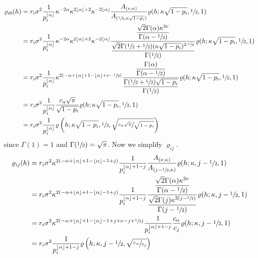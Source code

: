 \documentclass[11pt,a4paper]{article}
\theoremstyle{plain}
\theoremstyle{definition}
\begin{document}
\begin{align*}
    \varrho_{i0}(h) & = r_i\sigma^2\dfrac{1}{p_i^{\lfloor\alpha\rfloor}} \kappa^{-2\alpha}\kappa^{2\lfloor\alpha\rfloor+2}\kappa^{-2\lfloor\alpha\rfloor}\dfrac{A_{(\nu,\kappa)}}{A_{(\sfrac{1}{2},\kappa\sqrt{1-p_i})}}\varrho(h;\kappa\sqrt{1-p_i}, \sfrac{1}{2}, 1)\\
    & = r_i\sigma^2\dfrac{1}{p_i^{\lfloor\alpha\rfloor}} \kappa^{-2\alpha}\kappa^{2\lfloor\alpha\rfloor+2}\kappa^{-2\lfloor\alpha\rfloor}\dfrac{\dfrac{\sqrt{2}\Gamma(\alpha)\kappa^{2\nu}}{\Gamma(\alpha-\sfrac{1}{2})}}{\dfrac{\sqrt{2}\Gamma(\sfrac{1}{2}+\sfrac{1}{2})(\kappa\sqrt{1-p_i})^{2\cdot\sfrac{1}{2}}}{\Gamma(\sfrac{1}{2})}}\varrho(h;\kappa\sqrt{1-p_i}, \sfrac{1}{2}, 1)\\
    & = r_i\sigma^2\dfrac{1}{p_i^{\lfloor\alpha\rfloor}} \kappa^{2(-\alpha+\lfloor\alpha\rfloor+1-\lfloor\alpha\rfloor+\nu-\sfrac{1}{2})}\dfrac{\dfrac{\Gamma(\alpha)}{\Gamma(\alpha-\sfrac{1}{2})}}{\dfrac{\Gamma(\sfrac{1}{2}+\sfrac{1}{2})\sqrt{1-p_i}}{\Gamma(\sfrac{1}{2})}}\varrho(h;\kappa\sqrt{1-p_i}, \sfrac{1}{2}, 1)\\
    & = r_i\sigma^2\dfrac{1}{p_i^{\lfloor\alpha\rfloor}} \dfrac{c_\alpha\sqrt{\pi}}{\sqrt{1-p_i}}\varrho(h;\kappa\sqrt{1-p_i}, \sfrac{1}{2}, 1)\\
    & = r_i\sigma^2\dfrac{1}{p_i^{\lfloor\alpha\rfloor}} \varrho\left(h;\kappa\sqrt{1-p_i}, \sfrac{1}{2}, \sqrt{\sfrac{c_\alpha\sqrt{\pi}}{\sqrt{1-p_i}}}\right)
\end{align*}
since $\Gamma(1)=1$ and $\Gamma(\sfrac{1}{2}) = \sqrt{\pi}$. Now we simplify $\varrho_{ij}$.
\begin{align*}
    \varrho_{ij}(h) & = r_i\sigma^2\kappa^{2(-\alpha+\lfloor\alpha\rfloor+1-\lfloor\alpha\rfloor-1+j)}\dfrac{1}{p_i^{\lfloor\alpha\rfloor+1-j}}\dfrac{A_{(\nu,\kappa)}}{A_{(j-\sfrac{1}{2},\kappa)}}\varrho(h;\kappa, j-\sfrac{1}{2}, 1)\\
    & = r_i\sigma^2\kappa^{2(-\alpha+\lfloor\alpha\rfloor+1-\lfloor\alpha\rfloor-1+j)}\dfrac{1}{p_i^{\lfloor\alpha\rfloor+1-j}}\dfrac{\dfrac{\sqrt{2}\Gamma(\alpha)\kappa^{2\nu}}{\Gamma(\alpha-\sfrac{1}{2})}}{\dfrac{\sqrt{2}\Gamma(j)\kappa^{2(j-\sfrac{1}{2})}}{\Gamma(j-\sfrac{1}{2})}}\varrho(h;\kappa, j-\sfrac{1}{2}, 1)\\
    & = r_i\sigma^2\kappa^{2(-\alpha+\lfloor\alpha\rfloor+1-\lfloor\alpha\rfloor-1+j+\nu-j+\sfrac{1}{2})}\dfrac{1}{p_i^{\lfloor\alpha\rfloor+1-j}}\dfrac{c_\alpha}{c_j}\varrho(h;\kappa, j-\sfrac{1}{2}, 1)\\
    & = r_i\sigma^2\dfrac{1}{p_i^{\lfloor\alpha\rfloor+1-j}}\varrho\left(h;\kappa, j-\sfrac{1}{2}, \sqrt{\sfrac{c_\alpha}{c_j}}\right)
\end{align*}
\end{document}
